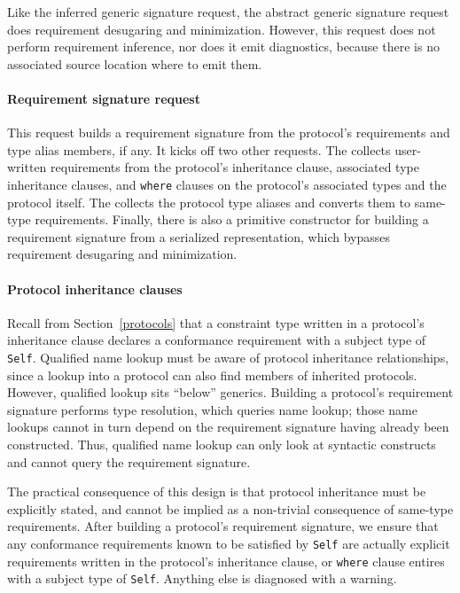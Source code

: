 \documentclass[../generics]{subfiles}
\begin{document}
%
Like the inferred generic signature request, the abstract generic signature request does requirement desugaring and minimization. However, this request does not perform requirement inference, nor does it emit diagnostics, because there is no associated source location where to emit them.

\paragraph{Requirement signature request}
%
%
%
%
%
%
%
%
%
This request builds a requirement signature from the protocol's requirements and type alias members, if any. It kicks off two other requests. The  collects user-written requirements from the protocol’s inheritance clause, associated type inheritance clauses, and \texttt{where} clauses on the protocol’s associated types and the protocol itself. The  collects the protocol type aliases and converts them to same-type requirements. Finally, there is also a primitive constructor for building a requirement signature from a serialized representation, which bypasses requirement desugaring and minimization.

\paragraph{Protocol inheritance clauses}
Recall from Section~\ref{protocols} that a constraint type written in a protocol's inheritance clause declares a conformance requirement with a subject type of \texttt{Self}. Qualified name lookup must be aware of protocol inheritance relationships, since a lookup into a protocol can also find members of inherited protocols. However, qualified lookup sits ``below'' generics. Building a protocol's requirement signature performs type resolution, which queries name lookup; those name lookups cannot in turn depend on the requirement signature having already been constructed. Thus, qualified name lookup can only look at syntactic constructs and cannot query the requirement signature.

The practical consequence of this design is that protocol inheritance must be explicitly stated, and cannot be implied as a non-trivial consequence of same-type requirements. After building a protocol's requirement signature, we ensure that any conformance requirements known to be satisfied by \texttt{Self} are actually explicit requirements written in the protocol's inheritance clause, or \texttt{where} clause entires with a subject type of \texttt{Self}. Anything else is diagnosed with a warning.
\end{document}
